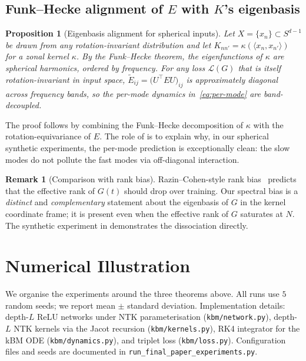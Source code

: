 \documentclass[11pt]{article}
\newtheorem{proposition}[theorem]{Proposition}
\theoremstyle{definition}
\newtheorem{remark}[theorem]{Remark}
\theoremstyle{plain}
\begin{document}
\subsection{Funk--Hecke alignment of $E$ with $K$'s eigenbasis}

\begin{proposition}[Eigenbasis alignment for spherical inputs]
\label{prop:funkhecke}
Let $X=\{x_n\}\subset S^{d-1}$ be drawn from any rotation-invariant
distribution and let $K_{nn'}=\kappa(\langle x_n,x_{n'}\rangle)$ for a
zonal kernel $\kappa$. By the Funk--Hecke theorem, the eigenfunctions
of $\kappa$ are spherical harmonics, ordered by frequency. For any
loss $\mathcal{L}(G)$ that is itself rotation-invariant in input space,
$\widetilde E_{ij}=\bigl(U^\top E U\bigr)_{ij}$ is approximately diagonal
across frequency bands, so the per-mode dynamics in~\eqref{eq:per-mode} are
band-decoupled.
\end{proposition}

The proof follows by combining the Funk--Hecke decomposition of $\kappa$ with
the rotation-equivariance of $E$. The role of  is to
explain why, in our spherical synthetic experiments, the per-mode prediction
is exceptionally clean: the slow modes do not pollute the fast modes via
off-diagonal interaction.

\begin{remark}[Comparison with rank bias]
Razin--Cohen-style rank bias~\citep{razin2020implicit} predicts that the
effective rank of $G(t)$ should drop over training. Our spectral bias is a
\emph{distinct} and \emph{complementary} statement about the eigenbasis of
$G$ in the kernel coordinate frame; it is present even when the effective
rank of $G$ saturates at $N$. The synthetic experiment in
 demonstrates the dissociation directly.
\end{remark}

\section{Numerical Illustration}
\label{sec:experiments}

We organise the experiments around the three theorems above. All runs use
$5$ random seeds; we report mean $\pm$ standard deviation. Implementation
details: depth-$L$ ReLU networks under NTK parameterisation
(\texttt{kbm/network.py}), depth-$L$ NTK kernels via the Jacot
recursion (\texttt{kbm/kernels.py}), RK4 integrator for the kBM ODE
(\texttt{kbm/dynamics.py}), and triplet loss
(\texttt{kbm/loss.py}). Configuration files and seeds are documented in
\texttt{run\_final\_paper\_experiments.py}.
\end{document}
